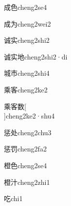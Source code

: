 \begin{verbete}[6;6]{成色}{cheng2se4}
\end{verbete}

\begin{verbete}[6;4]{成为}{cheng2wei2}
\end{verbete}

\begin{verbete}[8;8]{诚实}{cheng2shi2}
\end{verbete}

\begin{verbete}[8;8;6]{诚实地}{cheng2shi2·di}
\end{verbete}

\begin{verbete}[9;5]{城市}{cheng2shi4}
\end{verbete}

\begin{verbete}[10;9]{乘客}{cheng2ke2}
\end{verbete}

\begin{verbete}[10;9;13]{乘客数}[\\]{cheng2ke2·shu4}
\end{verbete}

\begin{verbete}[12;5]{惩处}{cheng2chu3}
\end{verbete}

\begin{verbete}[12;9]{惩罚}{cheng2fa2}
\end{verbete}

\begin{verbete}[16;6]{橙色}{cheng2se4}
\end{verbete}

\begin{verbete}[16;5]{橙汁}{cheng2zhi1}
\end{verbete}

\begin{verbete}[6]{吃}{chi1}
\end{verbete}


